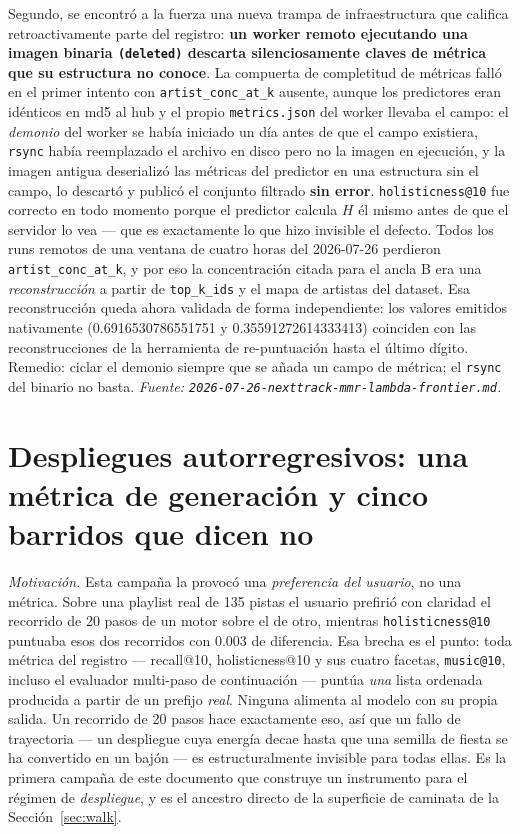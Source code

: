 \documentclass[11pt]{article}
\begin{document}
Segundo, se encontró a la fuerza una nueva trampa de infraestructura que califica
retroactivamente parte del registro: \textbf{un worker remoto ejecutando una
imagen binaria \texttt{(deleted)} descarta silenciosamente claves de métrica que
su estructura no conoce}. La compuerta de completitud de métricas falló en el
primer intento con \texttt{artist\_conc\_at\_k} ausente, aunque los predictores
eran idénticos en md5 al hub y el propio \texttt{metrics.json} del worker llevaba
el campo: el \emph{demonio} del worker se había iniciado un día antes de que el
campo existiera, \texttt{rsync} había reemplazado el archivo en disco pero no la
imagen en ejecución, y la imagen antigua deserializó las métricas del predictor en
una estructura sin el campo, lo descartó y publicó el conjunto filtrado
\textbf{sin error}. \texttt{holisticness@10} fue correcto en todo momento porque
el predictor calcula $H$ él mismo antes de que el servidor lo vea --- que es
exactamente lo que hizo invisible el defecto. Todos los runs remotos de una
ventana de cuatro horas del 2026-07-26 perdieron \texttt{artist\_conc\_at\_k}, y
por eso la concentración citada para el ancla B era una \emph{reconstrucción} a
partir de \texttt{top\_k\_ids} y el mapa de artistas del dataset. Esa
reconstrucción queda ahora validada de forma independiente: los valores emitidos
nativamente (\num{0.6916530786551751} y \num{0.35591272614333413}) coinciden con
las reconstrucciones de la herramienta de re-puntuación hasta el último dígito.
Remedio: ciclar el demonio siempre que se añada un campo de métrica; el
\texttt{rsync} del binario no basta.
\emph{Fuente: \texttt{2026-07-26-nexttrack-mmr-lambda-frontier.md}.}

\section{Despliegues autorregresivos: una métrica de generación y cinco barridos que dicen no}
\label{sec:rollout}
\emph{Motivación.} Esta campaña la provocó una \emph{preferencia del usuario}, no
una métrica. Sobre una playlist real de 135 pistas el usuario prefirió con
claridad el recorrido de 20 pasos de un motor sobre el de otro, mientras
\texttt{holisticness@10} puntuaba esos dos recorridos con \num{0.003} de
diferencia. Esa brecha es el punto: toda métrica del registro --- recall@10,
holisticness@10 y sus cuatro facetas, \texttt{music@10}, incluso el evaluador
multi-paso de continuación --- puntúa \emph{una} lista ordenada producida a partir
de un prefijo \emph{real}. Ninguna alimenta al modelo con su propia salida. Un
recorrido de 20 pasos hace exactamente eso, así que un fallo de trayectoria --- un
despliegue cuya energía decae hasta que una semilla de fiesta se ha convertido en
un bajón --- es estructuralmente invisible para todas ellas. Es la primera campaña
de este documento que construye un instrumento para el régimen de
\emph{despliegue}, y es el ancestro directo de la superficie de caminata de la
Sección~\ref{sec:walk}.
\end{document}
